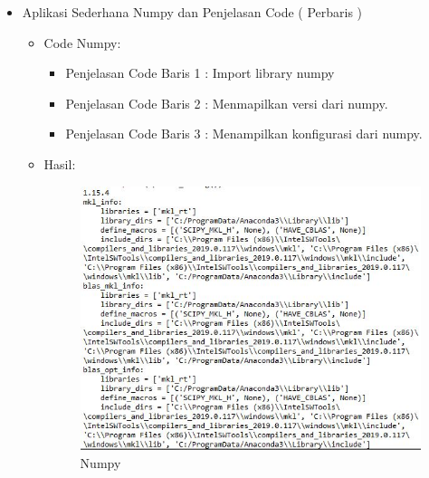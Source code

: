 \begin{enumerate}
\begin{itemize}
\par
\par
\item Aplikasi Sederhana Numpy dan Penjelasan Code ( Perbaris )
\begin{itemize}
\item Code Numpy:
\par 
\par
\begin{itemize}
\item Penjelasan Code Baris 1 : Import library numpy
\par
\item Penjelasan Code Baris 2 : Menmapilkan versi dari numpy.
\par
\item Penjelasan Code Baris 3 : Menampilkan konfigurasi dari numpy.
\par
\end{itemize}
\item Hasil:
\par
\par
\begin{figure}[ht]
\centering
\includegraphics[scale=0.8]{figures/numpyy.jpg}
\caption{Numpy}
\label{contoh}
\end{figure}
\par
\par


\end{itemize}
\end{itemize}
\end{enumerate}
